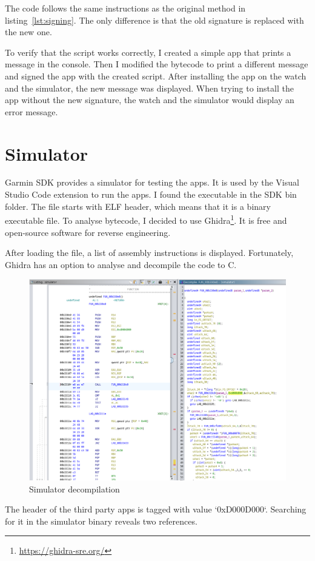 The code follows the same instructions as the original method in listing~\ref{lst:signing}.
The only difference is that the old signature is replaced with the new one.

To verify that the script works correctly, I created a simple app that prints a message in the console.
Then I modified the bytecode to print a different message and signed the app with the created script.
After installing the app on the watch and the simulator, the new message was displayed.
When trying to install the app without the new signature, the watch and the simulator would display an error message.

\section{Simulator}
Garmin SDK provides a simulator for testing the apps.
It is used by the Visual Studio Code extension to run the apps.
I found the executable in the SDK bin folder.
The file starts with ELF header, which means that it is a binary executable file.
To analyse bytecode, I decided to use Ghidra\footnote{\url{https://ghidra-sre.org/}}.
It is free and open-source software for reverse engineering.

After loading the file, a list of assembly instructions is displayed.
Fortunately, Ghidra has an option to analyse and decompile the code to C\@.

\begin{figure}[h]
    \centering
    \includegraphics[width=0.7\linewidth]{../../images/ghidra}
    \caption{Simulator decompilation}
    \label{fig:concept}
\end{figure}

The header of the third party apps is tagged with value `0xD000D000`\cite{broken-vm}.
Searching for it in the simulator binary reveals two references.

